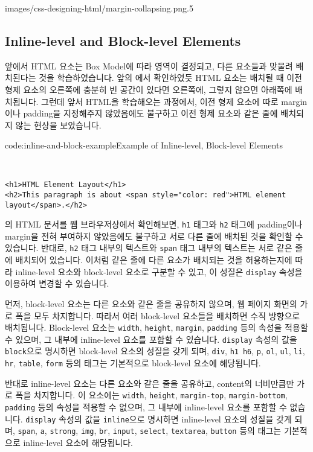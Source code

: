     {images/css-designing-html/margin-collapsing.png}{.5}

\subsection*{Inline-level and Block-level Elements}
앞에서 HTML 요소는 Box Model에 따라 영역이 결정되고, 다른 요소들과 맞물려 배치된다는 것을 학습하였습니다. 앞의 에서 확인하였듯 HTML 요소는 배치될 때 이전 형제 요소의 오른쪽에 충분히 빈 공간이 있다면 오른쪽에, 그렇지 않으면 아래쪽에 배치됩니다. 그런데 앞서 HTML을 학습해오는 과정에서, 이전 형제 요소에 따로 margin이나 padding을 지정해주지 않았음에도 불구하고 이전 형제 요소와 같은 줄에 배치되지 않는 현상을 보았습니다. 

\begin{codeenv}{code:inline-and-block-example}{Example of Inline-level, Block-level Elements}\begin{verbatim}


<h1>HTML Element Layout</h1>
<h2>This paragraph is about <span style="color: red">HTML element layout</span>.</h2>
\end{verbatim}
\end{codeenv}

의 HTML 문서를 웹 브라우저상에서 확인해보면, \verb|h1| 태그와 \verb|h2| 태그에 padding이나 margin을 전혀 부여하지 않았음에도 불구하고 서로 다른 줄에 배치된 것을 확인할 수 있습니다. 반대로, \verb|h2| 태그 내부의 텍스트와 \verb|span| 태그 내부의 텍스트는 서로 같은 줄에 배치되어 있습니다. 이처럼 같은 줄에 다른 요소가 배치되는 것을 허용하는지에 따라 inline-level 요소와 block-level 요소로 구분할 수 있고, 이 성질은 \verb|display| 속성을 이용하여 변경할 수 있습니다. 

먼저, block-level 요소는 다른 요소와 같은 줄을 공유하지 않으며, 웹 페이지 화면의 가로 폭을 모두 차지합니다. 따라서 여러 block-level 요소들을 배치하면 수직 방향으로 배치됩니다. Block-level 요소는 \verb|width|, \verb|height|, \verb|margin|, \verb|padding| 등의 속성을 적용할 수 있으며, 그 내부에 inline-level 요소를 포함할 수 있습니다. \verb|display| 속성의 값을 \verb|block|으로 명시하면 block-level 요소의 성질을 갖게 되며, \verb|div|, \verb|h1|~\verb|h6|, \verb|p|, \verb|ol|, \verb|ul|, \verb|li|, \verb|hr|, \verb|table|, \verb|form| 등의 태그는 기본적으로 block-level 요소에 해당됩니다. 

반대로 inline-level 요소는 다른 요소와 같은 줄을 공유하고, content의 너비만큼만 가로 폭을 차지합니다. 이 요소에는 \verb|width|, \verb|height|, \verb|margin-top|, \verb|margin-bottom|, \verb|padding| 등의 속성을 적용할 수 없으며, 그 내부에 inline-level 요소를 포함할 수 없습니다. \verb|display| 속성의 값을 \verb|inline|으로 명시하면 inline-level 요소의 성질을 갖게 되며, \verb|span|, \verb|a|, \verb|strong|, \verb|img|, \verb|br|, \verb|input|, \verb|select|, \verb|textarea|, \verb|button| 등의 태그는 기본적으로 inline-level 요소에 해당됩니다. 

